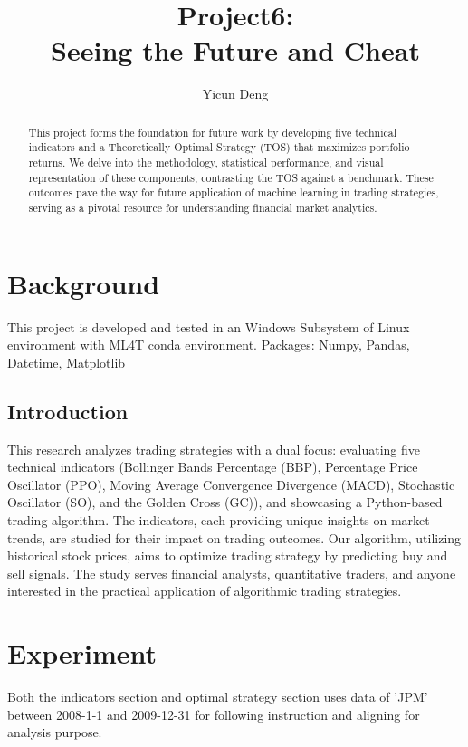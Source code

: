 \documentclass[
	letterpaper, %
]{jdf}
\author{Yicun Deng}
\title{Project6: \\Seeing the Future and Cheat}
\begin{document}

\maketitle

\begin{abstract}
	This project forms the foundation for future work by developing five technical indicators and a Theoretically Optimal Strategy (TOS) that maximizes portfolio returns. We delve into the methodology, statistical performance, and visual representation of these components, contrasting the TOS against a benchmark. These outcomes pave the way for future application of machine learning in trading strategies, serving as a pivotal resource for understanding financial market analytics.
\end{abstract}
	

\section{Background}
This project is developed and tested in an Windows Subsystem of Linux environment with ML4T conda environment. Packages: Numpy, Pandas, Datetime, Matplotlib

\subsection{Introduction}

This research analyzes trading strategies with a dual focus: evaluating five technical indicators (Bollinger Bands Percentage (BBP), Percentage Price Oscillator (PPO), Moving Average Convergence Divergence (MACD), Stochastic Oscillator (SO), and the Golden Cross (GC)), and showcasing a Python-based trading algorithm. The indicators, each providing unique insights on market trends, are studied for their impact on trading outcomes. Our algorithm, utilizing historical stock prices, aims to optimize trading strategy by predicting buy and sell signals. The study serves financial analysts, quantitative traders, and anyone interested in the practical application of algorithmic trading strategies.

\section{Experiment}
Both the indicators section and optimal strategy section uses data of 'JPM' between 2008-1-1 and 2009-12-31 for following instruction and aligning for analysis purpose.
\end{document}
